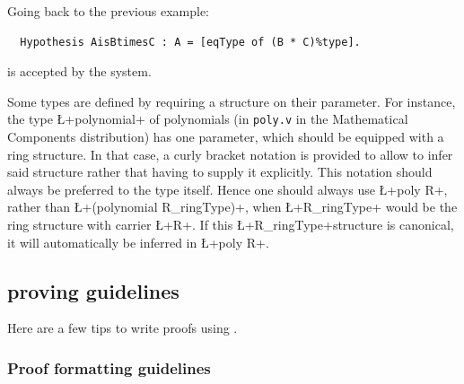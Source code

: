 Going back to the previous example:
\begin{lstlisting}
  Hypothesis AisBtimesC : A = [eqType of (B * C)%type].
\end{lstlisting}
is accepted by the system.


Some types are defined by requiring a structure on their
parameter. For instance, the type \L+polynomial+ of polynomials (in
{\tt poly.v} in the Mathematical Components distribution) has one
parameter, which should be equipped with a ring structure. In that
case, a curly bracket notation is provided to allow \Coq{} to infer said
structure rather that having to supply it explicitly. This notation
should always be preferred to the type itself. Hence one should always
use \L+{poly R}+, rather than \L+(polynomial R_ringType)+, when
\L+R_ringType+ would be the ring structure with carrier \L+R+. If this
\L+R_ringType+structure is canonical, it will automatically be
inferred in \L+{poly R}+.

\subsection{\ssr{} proving guidelines}

Here are a few tips to write proofs using \ssr{}.

\subsubsection*{Proof formatting guidelines}

